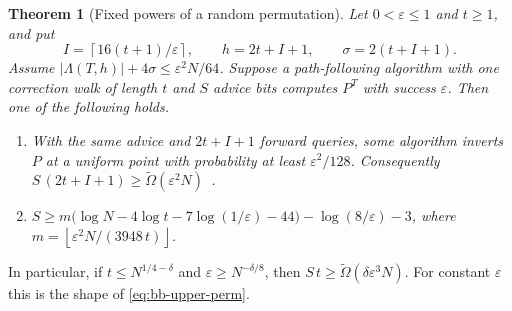 \documentclass[11pt]{article}
\newtheorem{theorem}{Theorem}[section]
\theoremstyle{definition}
\theoremstyle{remark}
\newcommand{\floor}[1]{\left\lfloor #1\right\rfloor}
\newcommand{\ceil}[1]{\left\lceil #1\right\rceil}
\numberwithin{equation}{section}
\begin{document}
\begin{theorem}[Fixed powers of a random permutation]\label{thm:bb-perm}
Let $0<\varepsilon\leq1$ and $t\geq1$, and put
\[
  I=\ceil{16(t+1)/\varepsilon},\qquad h=2t+I+1,\qquad\sigma=2(t+I+1).
\]
Assume $|\Lambda(T,h)|+4\sigma\leq\varepsilon^2N/64$.  Suppose a
path-following algorithm with one correction walk of length $t$ and $S$
advice bits computes $P^T$ with success $\varepsilon$.  Then one of the
following holds.
\begin{enumerate}[label=(\roman*)]
\item With the same advice and $2t+I+1$ forward queries, some algorithm
  inverts $P$ at a uniform point with probability at least
  $\varepsilon^2/128$.  Consequently
  $S\,(2t+I+1)\geq\widetilde\Omega(\varepsilon^2N)$~\cite{Yao90,DTT10}.
\item $S\geq m\bigl(\log N-4\log t-7\log(1/\varepsilon)-44\bigr)
  -\log(8/\varepsilon)-3$, where
  $m=\floor{\varepsilon^2N/(3948\,t)}$.
\end{enumerate}
\end{theorem}

In particular, if $t\leq N^{1/4-\delta}$ and $\varepsilon\geq N^{-\delta/8}$,
then $S\,t\geq\widetilde\Omega(\delta\varepsilon^3N)$.  For constant
$\varepsilon$ this is the shape of \cref{eq:bb-upper-perm}.
\end{document}

